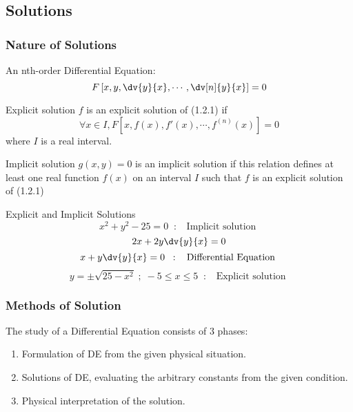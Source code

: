 \subsection{Solutions}


\subsubsection{Nature of Solutions}
An nth-order Differential Equation:
\begin{equation}
    F \left[ x, y, \dv{y}{x}, \cdots, \dv[n]{y}{x} \right] = 0
\end{equation}

\begin{definition}{Explicit solution}{}
    $f$ is an explicit solution of (1.2.1) if \[
        \forall x \in I, F \left[ x, f(x), f'(x), \cdots, f^{(n)}(x) \right] = 0
    \] where $I$ is a real interval.
\end{definition}

\begin{definition}{Implicit solution}{}
    $g(x,y)=0$ is an implicit solution if this relation defines at least one real function $f(x)$ on an interval $I$ such that $f$ is an explicit solution of (1.2.1)
\end{definition}

\begin{example}{Explicit and Implicit Solutions}{}
    \[ x^2 + y^2 - 25 = 0 \;\;:\;\; \text{ Implicit solution } \]
    \[ 2x + 2y\dv{y}{x} = 0 \]
    \[ x + y\dv{y}{x} = 0 \;\;:\;\; \text{ Differential Equation } \]
    \[ y = \pm \sqrt{25 - x^2} \;;\; -5 \le x \le 5 \;\;:\;\; \text{ Explicit solution } \]
\end{example}

\vspace{20pt}
\subsubsection{Methods of Solution}

The study of a Differential Equation consists of $3$ phases:
\begin{enumerate}
    \item Formulation of DE from the given physical situation.
    \item Solutions of DE, evaluating the arbitrary constants from the given condition.
    \item Physical interpretation of the solution.
\end{enumerate}

